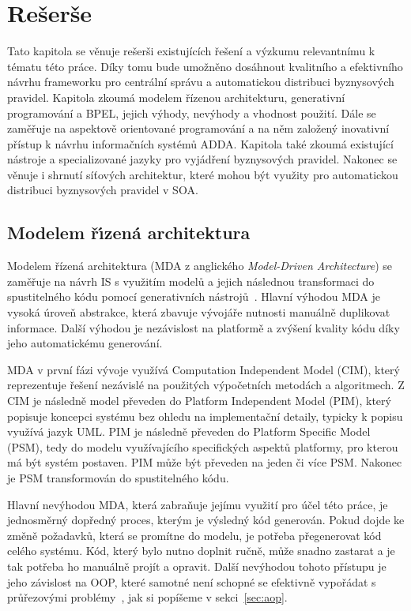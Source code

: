 
\chapter{Rešerše}\label{ch:reserse}

Tato kapitola se věnuje rešerši existujících řešení
a výzkumu relevantnímu k tématu této práce. Díky tomu bude umožněno
dosáhnout kvalitního a efektivního návrhu frameworku pro centrální správu a automatickou
distribuci byznysových pravidel.
Kapitola zkoumá modelem řízenou architekturu, generativní
programování a BPEL, jejich výhody, nevýhody a vhodnost použití.
Dále se zaměřuje na aspektově orientované programování
a na něm založený inovativní přístup k návrhu informačních systémů \gls{ADDA}.
Kapitola také zkoumá existující nástroje a specializované jazyky pro vyjádření
byznysových pravidel.
Nakonec se věnuje i shrnutí síťových architektur, které mohou být využity
pro automatickou distribuci byznysových pravidel v \gls{SOA}.

\section{Modelem ř\'{\i}zená architektura}

Modelem řízená architektura (\gls{MDA} z anglického \textit{Model-Driven
Architecture}) se zaměřuje na návrh \gls{IS} s využitím modelů a jejich
následnou transformaci do spustitelného kódu pomocí generativních nástrojů~\cite{soley2000model}.
Hlavní výhodou \gls{MDA} je vysoká úroveň abstrakce, která zbavuje vývojáře nutnosti
manuálně duplikovat informace. Další výhodou je nezávislost na platformě a zvýšení
kvality kódu díky jeho automatickému generování.

\gls{MDA} v první fázi vývoje využívá Computation Independent Model (\gls{CIM}), který reprezentuje
řešení nezávislé na použitých výpočetních metodách a algoritmech. Z \gls{CIM} je
následně model převeden do Platform Independent Model (\gls{PIM}),
který popisuje koncepci systému bez ohledu na implementační detaily, typicky k popisu
využívá jazyk \gls{UML}. \gls{PIM} je následně převeden do
Platform Specific Model (\gls{PSM}), tedy do modelu využívajícího
specifických aspektů platformy, pro kterou má být systém postaven.
\gls{PIM} může být převeden na jeden či více \gls{PSM}.
Nakonec je \gls{PSM} transformován do spustitelného kódu.

Hlavní nevýhodou \gls{MDA}, která zabraňuje jejímu využití
pro účel této práce, je jednosměrný dopředný proces, kterým je výsledný kód generován.
Pokud dojde ke změně požadavků, která se promítne do modelu, je potřeba přegenerovat
kód celého systému. Kód, který bylo nutno doplnit ručně, může snadno zastarat a je tak
potřeba ho manuálně projít a opravit.
Další nevýhodou tohoto přístupu je jeho závislost na \gls{OOP},
které samotné není schopné se efektivně vypořádat s průřezovými
problémy~\cite{kennard2009separation}\cite{cemus2014aspect}, jak si popíšeme v sekci~\ref{sec:aop}.


